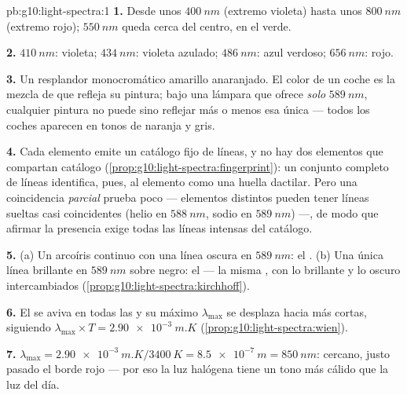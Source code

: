 \begin{solution}{pb:g10:light-spectra:1}
\textbf{1.} Desde unos $\qty{400}{nm}$ (extremo violeta) hasta unos
$\qty{800}{nm}$ (extremo rojo); $\qty{550}{nm}$ queda cerca del centro,
en el verde.

\textbf{2.} $\qty{410}{nm}$: violeta; $\qty{434}{nm}$: violeta azulado;
$\qty{486}{nm}$: azul verdoso; $\qty{656}{nm}$: rojo.

\textbf{3.} Un resplandor monocromático amarillo anaranjado. El color de
un coche es la mezcla de  que refleja su pintura; bajo
una lámpara que ofrece \emph{solo} $\qty{589}{nm}$, cualquier pintura no
puede sino reflejar más o menos esa única  --- todos los
coches aparecen en tonos de naranja y gris.

\textbf{4.} Cada elemento emite un catálogo fijo de líneas, y no hay dos
elementos que compartan catálogo
(\cref{prop:g10:light-spectra:fingerprint}): un conjunto completo de
líneas identifica, pues, al elemento como una huella dactilar. Pero una
coincidencia \emph{parcial} prueba poco --- elementos distintos pueden
tener líneas sueltas casi coincidentes (helio en $\qty{588}{nm}$, sodio
en $\qty{589}{nm}$) ---, de modo que afirmar la presencia exige todas
las líneas intensas del catálogo.

\textbf{5.} (a) Un arcoíris continuo con una línea oscura en
$\qty{589}{nm}$: el . (b) Una única línea brillante
en $\qty{589}{nm}$ sobre negro: el  --- la misma
, con lo brillante y lo oscuro intercambiados
(\cref{prop:g10:light-spectra:kirchhoff}).

\textbf{6.} El  se aviva en todas las  y su
máximo $\lambda_{\max}$ se desplaza hacia  más cortas,
siguiendo $\lambda_{\max} \times T = \qty{2.90e-3}{m.K}$
(\cref{prop:g10:light-spectra:wien}).

\textbf{7.} $\lambda_{\max} = \qty{2.90e-3}{m.K} / \qty{3400}{K}
= \qty{8.5e-7}{m} = \qty{850}{nm}$:  cercano, justo pasado el
borde rojo --- por eso la luz halógena tiene un tono más cálido que la
luz del día.


\end{solution}
